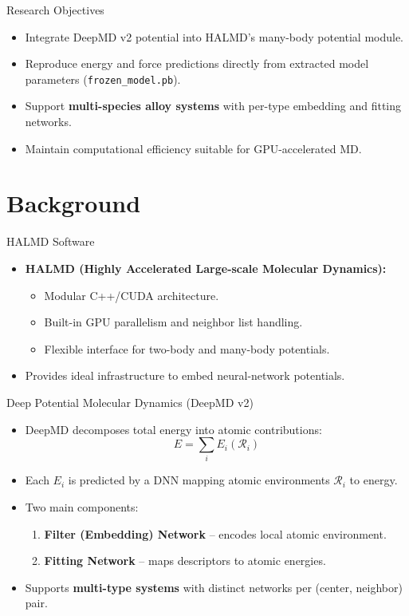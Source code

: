 \documentclass[aspectratio=169]{beamer}
\begin{document}
\begin{frame}{Research Objectives}
\begin{itemize}
    \item Integrate DeepMD v2 potential into HALMD’s many-body potential module.
    \item Reproduce energy and force predictions directly from extracted model parameters (\texttt{frozen\_model.pb}).
    \item Support \textbf{multi-species alloy systems} with per-type embedding and fitting networks.
    \item Maintain computational efficiency suitable for GPU-accelerated MD.
\end{itemize}
\end{frame}

\section{Background}

\begin{frame}{HALMD Software}
\begin{itemize}
    \item \textbf{HALMD (Highly Accelerated Large-scale Molecular Dynamics):}
    \begin{itemize}
        \item Modular C++/CUDA architecture.
        \item Built-in GPU parallelism and neighbor list handling.
        \item Flexible interface for two-body and many-body potentials.
    \end{itemize}
    \item Provides ideal infrastructure to embed neural-network potentials.
\end{itemize}
\end{frame}

\begin{frame}{Deep Potential Molecular Dynamics (DeepMD v2)}
\begin{itemize}
    \item DeepMD decomposes total energy into atomic contributions:
    \[
    E = \sum_i E_i(\mathcal{R}_i)
    \]
    \item Each $E_i$ is predicted by a DNN mapping atomic environments $\mathcal{R}_i$ to energy.
    \item Two main components:
    \begin{enumerate}
        \item \textbf{Filter (Embedding) Network} – encodes local atomic environment.
        \item \textbf{Fitting Network} – maps descriptors to atomic energies.
    \end{enumerate}
    \item Supports \textbf{multi-type systems} with distinct networks per (center, neighbor) pair.
\end{itemize}
\end{frame}
\end{document}
